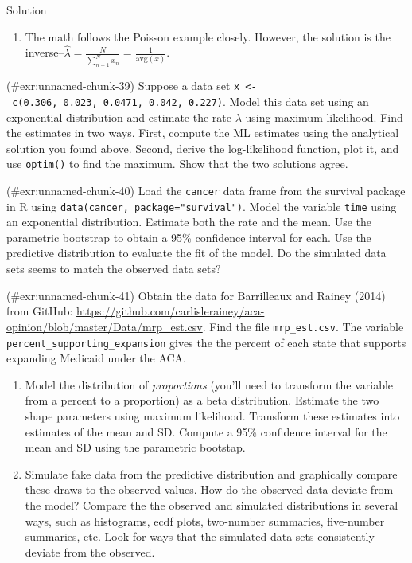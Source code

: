 \documentclass[
]{book}
\providecommand{\tightlist}{%
  \setlength{\itemsep}{0pt}\setlength{\parskip}{0pt}}
\begin{document}
Solution

\begin{enumerate}
\def\labelenumi{\arabic{enumi}.}
\tightlist
\item
  The math follows the Poisson example closely. However, the solution is
  the
  inverse--\(\hat{\lambda} = \frac{N}{\sum_{n = 1}^N x_n } = \frac{1}{\text{avg}(x)}\).
\end{enumerate}


\protect\hypertarget{exr:unnamed-chunk-39}{}{(\#exr:unnamed-chunk-39)
}Suppose a data set
\texttt{x\ \textless{}-\ c(0.306,\ 0.023,\ 0.0471,\ 0.042,\ 0.227)}.
Model this data set using an exponential distribution and estimate the
rate \(\lambda\) using maximum likelihood. Find the estimates in two
ways. First, compute the ML estimates using the analytical solution you
found above. Second, derive the log-likelihood function, plot it, and
use \texttt{optim()} to find the maximum. Show that the two solutions
agree. 


\protect\hypertarget{exr:unnamed-chunk-40}{}{(\#exr:unnamed-chunk-40)
}Load the \texttt{cancer} data frame from the survival package in R
using \texttt{data(cancer,\ package="survival")}. Model the variable
\texttt{time} using an exponential distribution. Estimate both the rate
and the mean. Use the parametric bootstrap to obtain a 95\% confidence
interval for each. Use the predictive distribution to evaluate the fit
of the model. Do the simulated data sets seems to match the observed
data sets? 


\protect\hypertarget{exr:unnamed-chunk-41}{}{(\#exr:unnamed-chunk-41)
}Obtain the data for Barrilleaux and Rainey (2014) from GitHub:
\url{https://github.com/carlislerainey/aca-opinion/blob/master/Data/mrp_est.csv}.
Find the file \texttt{mrp\_est.csv}. The variable
\texttt{percent\_supporting\_expansion} gives the the percent of each
state that supports expanding Medicaid under the ACA.

\begin{enumerate}
\def\labelenumi{\arabic{enumi}.}
\tightlist
\item
  Model the distribution of \emph{proportions} (you'll need to transform
  the variable from a percent to a proportion) as a beta distribution.
  Estimate the two shape parameters using maximum likelihood. Transform
  these estimates into estimates of the mean and SD. Compute a 95\%
  confidence interval for the mean and SD using the parametric bootstap.
\item
  Simulate fake data from the predictive distribution and graphically
  compare these draws to the observed values. How do the observed data
  deviate from the model? Compare the the observed and simulated
  distributions in several ways, such as histograms, ecdf plots,
  two-number summaries, five-number summaries, etc. Look for ways that
  the simulated data sets consistently deviate from the observed.
\end{enumerate}
\end{document}
